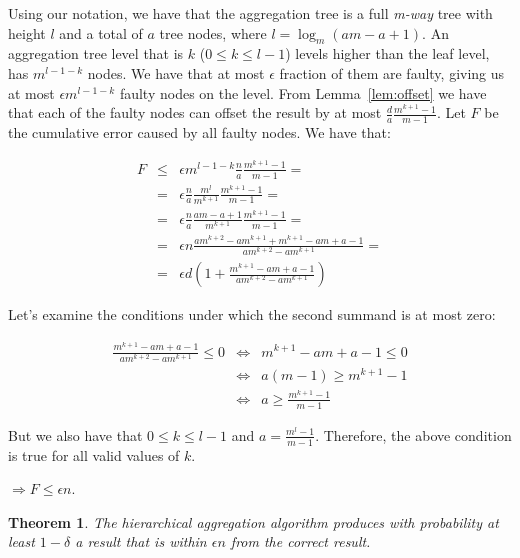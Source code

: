 \documentclass{article}
\newtheorem{thm}{Theorem}[section]
\newenvironment{proof}[1][Proof]{\begin{trivlist}
\item[\hskip \labelsep {\bfseries #1}]}{\end{trivlist}}
\begin{document}
\begin{proof}
Using our notation, we have that the aggregation tree is a
full \emph{m-way} tree with height $l$ and a total of $a$ tree nodes, where
$l = \log_m(am-a+1)$. An aggregation tree level that is $k$ ($0 \leq
k \leq l-1$) levels higher than the leaf level, has $m^{l-1-k}$ nodes. We
have that at most $\epsilon$ fraction of them are faulty, giving us at
most $\epsilon m^{l-1-k}$ faulty nodes on the level. From
Lemma~\ref{lem:offset} we have that each of the faulty nodes can
offset the result by at most  $\frac{d}{a}\frac{m^{k+1} -1}{m-1}$. Let
$F$ be the cumulative error caused by all faulty nodes. We have
that:

\begin{eqnarray*}
F &\leq& \epsilon m^{l-1-k} \frac{n}{a}\frac{m^{k+1}-1}{m-1}=\\
&=& \epsilon \frac{n}{a}\frac{m^l}{m^{k+1}}\frac{m^{k+1}-1}{m-1}=\\
&=& \epsilon \frac{n}{a}\frac{am-a+1}{m^{k+1}}\frac{m^{k+1}-1}{m-1}=\\
&=& \epsilon n\frac{am^{k+2} - am^{k+1} + m^{k+1} - am + a
  -1}{am^{k+2} - am^{k+1}}=\\
&=& \epsilon d (1 + \frac{m^{k+1}-am + a -1}{am^{k+2} - am^{k+1}})
\end{eqnarray*}

\noindent Let's examine the conditions under which the second summand
is at most zero:

\begin{eqnarray*}
\frac{m^{k+1}-am + a -1}{am^{k+2} - am^{k+1}} \leq 0 &\Leftrightarrow&
m^{k+1}-am + a -1 \leq 0\\
&\Leftrightarrow& a(m-1) \geq m^{k+1}-1\\
&\Leftrightarrow& a \geq \frac{m^{k+1}-1}{m-1}
\end{eqnarray*}

\noindent But we also have that $0 \leq k \leq l-1$ and $a =
\frac{m^l-1}{m-1}$. Therefore, the above condition is true for all
valid values of $k$.

$\Rightarrow F \leq \epsilon n$.
\end{proof}

\begin{thm} The hierarchical aggregation algorithm produces with
  probability at least $1-\delta$ a result
  that is within $\epsilon n$ from the correct result.
\end{thm}
\end{document}
